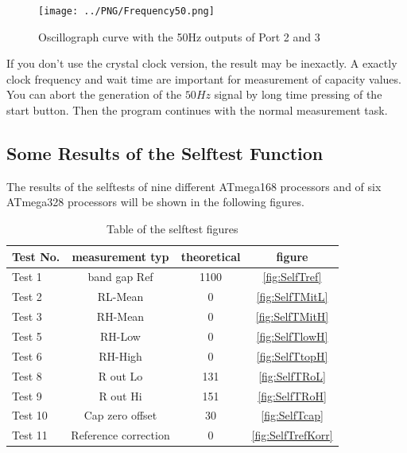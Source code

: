\begin{figure}[H]
\centering
\texttt{[image: ../PNG/Frequency50.png]}
\caption{Oscillograph curve with the 50Hz outputs of Port 2 and 3}
\label{fig:Frequency50}
\end{figure}


If you don't use the crystal clock version, the result may be inexactly.
A exactly clock frequency and wait time are important for measurement of capacity values.
You can abort the generation of the \(50Hz\) signal by long time pressing of the start button.
Then the program continues with the normal measurement task.

\subsection{Some Results of the Selftest Function}

The results of the selftests of nine different ATmega168 processors and of six ATmega328 processors
will be shown in the following figures.

\begin{table}[H]
  \begin{center}
    \begin{tabular}{| l | c | c | c |}
    \hline
Test No. & measurement typ & theoretical & figure \\
    \hline
    \hline
Test 1 & band gap Ref  & 1100 & \ref{fig:SelfTref} \\
    \hline
Test 2 & RL-Mean & 0 & \ref{fig:SelfTMitL} \\
    \hline
Test 3 & RH-Mean & 0 & \ref{fig:SelfTMitH} \\
    \hline
Test 5 & RH-Low &  0 & \ref{fig:SelfTlowH} \\
    \hline
Test 6 & RH-High & 0 & \ref{fig:SelfTtopH} \\
    \hline
Test 8 & R out Lo & 131 & \ref{fig:SelfTRoL} \\
    \hline
Test 9 & R out Hi & 151 & \ref{fig:SelfTRoH} \\
    \hline
Test 10 & Cap zero offset & 30 & \ref{fig:SelfTcap} \\
    \hline
Test 11 & Reference correction & 0 & \ref{fig:SelfTrefKorr} \\
    \hline
    \end{tabular}
  \end{center}
  \caption{Table of the selftest figures }
  \label{tab:test_m168} 
\end{table}

